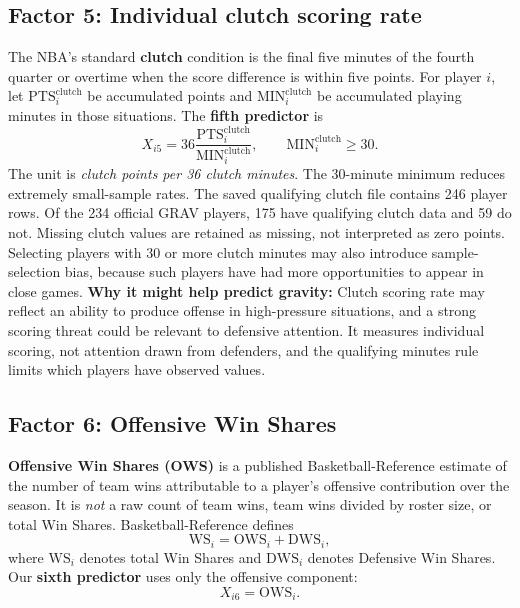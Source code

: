 \documentclass[11pt]{article}
\begin{document}
\subsection{Factor 5: Individual clutch scoring rate}
The NBA's standard \textbf{clutch} condition is the final five minutes
of the fourth quarter or overtime when the score difference is within
five points. For player $i$, let $\mathrm{PTS}^{\mathrm{clutch}}_i$
be accumulated points and $\mathrm{MIN}^{\mathrm{clutch}}_i$
be accumulated playing minutes in those situations. The
\textbf{fifth predictor} is
\begin{equation}
 \boxed{X_{i5}=36\frac{\mathrm{PTS}^{\mathrm{clutch}}_i}
 {\mathrm{MIN}^{\mathrm{clutch}}_i}},
 \qquad \mathrm{MIN}^{\mathrm{clutch}}_i\ge 30.
 \label{eq:clutch}
\end{equation}
The unit is \emph{clutch points per 36 clutch minutes}. The 30-minute minimum reduces extremely small-sample rates. The
saved qualifying clutch file contains 246 player rows. Of the 234 official
GRAV players, 175 have qualifying clutch data and 59 do not. Missing
clutch values are retained as missing, not interpreted as zero points.
Selecting players with 30 or more clutch minutes may also introduce
sample-selection bias, because such players have had more opportunities
to appear in close games.
\textbf{Why it might help predict gravity:} Clutch scoring rate may reflect
an ability to produce offense in high-pressure situations, and a strong
scoring threat could be relevant to defensive attention. It measures
individual scoring, not attention drawn from defenders, and the qualifying
minutes rule limits which players have observed values.

\subsection{Factor 6: Offensive Win Shares}
\textbf{Offensive Win Shares (OWS)} is a published Basketball-Reference
estimate of the number of team wins attributable to a player's offensive
contribution over the season. It is \emph{not} a raw count of team wins,
team wins divided by roster size, or total Win Shares.
Basketball-Reference defines
\begin{equation}
 \mathrm{WS}_i=\mathrm{OWS}_i+\mathrm{DWS}_i,
 \label{eq:winshares}
\end{equation}
where $\mathrm{WS}_i$ denotes total Win Shares and $\mathrm{DWS}_i$
denotes Defensive Win Shares. Our \textbf{sixth predictor} uses only the
offensive component:
\begin{equation}
 \boxed{X_{i6}=\mathrm{OWS}_i.}
 \label{eq:ws-predictor}
\end{equation}
\end{document}
